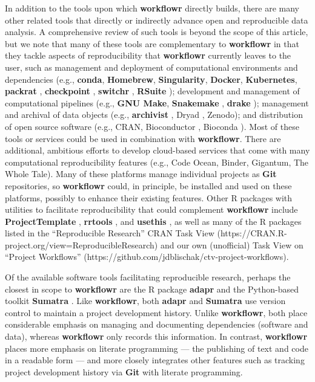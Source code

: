 \documentclass[9pt,a4paper]{extarticle}
\begin{document}
In addition to the tools upon which \textbf{workflowr} directly builds, there are
many other related tools that directly or indirectly advance open and
reproducible data analysis. A comprehensive review of such tools is
beyond the scope of this article, but we note that many of these tools
are complementary to \textbf{workflowr} in that they tackle aspects of
reproducibility that \textbf{workflowr} currently leaves to the user, such as
management and deployment of computational environments and dependencies
(e.g., \textbf{conda}, \textbf{Homebrew}, \textbf{Singularity}, \textbf{Docker}, \textbf{Kubernetes}, \textbf{packrat}
\cite{packrat}, \textbf{checkpoint} \cite{checkpoint}, \textbf{switchr} \cite{switchr},
 \textbf{RSuite} \cite{RSuite}); development and management of computational
pipelines (e.g., \textbf{GNU Make}, \textbf{Snakemake} \cite{snakemake}, \textbf{drake}
\cite{drake}); management and archival of data objects (e.g., \textbf{archivist}
\cite{archivist}, Dryad \cite{dryad}, Zenodo); and distribution of open
source software (e.g., CRAN, Bioconductor \cite{bioconductor}, Bioconda
\cite{bioconda}). Most of these tools or services could be used in
combination with \textbf{workflowr}. There are additional, ambitious efforts to
develop cloud-based services that come with many computational
reproducibility features (e.g., Code Ocean, Binder, Gigantum, The Whole
Tale). Many of these platforms manage individual projects as \textbf{Git}
repositories, so \textbf{workflowr} could, in principle, be installed and used on
these platforms, possibly to enhance their existing features. Other R
packages with utilities to facilitate reproducibility that could
complement \textbf{workflowr} include \textbf{ProjectTemplate} \cite{projecttemplate},
 \textbf{rrtools} \cite{rrtools}, and \textbf{usethis} \cite{usethis}, as well as many of
the R packages listed in the ``Reproducible Research'' CRAN Task View
(https://CRAN.R-project.org/view=ReproducibleResearch) and our own
(unofficial) Task View on ``Project Workflows''
(https://github.com/jdblischak/ctv-project-workflows).

Of the available software tools facilitating reproducible research,
perhaps the closest in scope to \textbf{workflowr} are the R package \textbf{adapr}
\cite{Gelfond2018} and the Python-based toolkit \textbf{Sumatra}
\cite{Davidson2014}. Like \textbf{workflowr}, both \textbf{adapr} and \textbf{Sumatra} use version
control to maintain a project development history. Unlike \textbf{workflowr},
both place considerable emphasis on managing and documenting
dependencies (software and data), whereas \textbf{workflowr} only records this
information. In contrast, \textbf{workflowr} places more emphasis on literate
programming --- the publishing of text and code in a readable form ---
and more closely integrates other features such as tracking project
development history via \textbf{Git} with literate programming.
\end{document}

